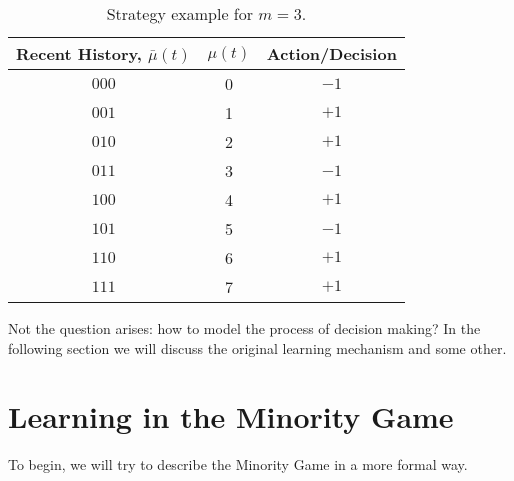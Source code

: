 \documentclass[11pt,american,czech]{article}
\begin{document}
\begin{table}
	\centering
	\begin{tabular}{|c|c||c|}
		\hline
		Recent History, $\bar{\mu}(t)$ & $\mu(t)$ & Action/Decision \\
		\hline
		\hline 
		$0 0 0$ & 0 & $-1$ \\ 
		$0 0 1$ & 1 & $+1$ \\ 
		$0 1 0$ & 2 & $+1$ \\ 
		$0 1 1$ & 3 & $-1$ \\ 
		$1 0 0$ & 4 & $+1$ \\ 
		$1 0 1$ & 5 & $-1$ \\ 
		$1 1 0$ & 6 & $+1$ \\ 
		$1 1 1$ & 7 & $+1$ \\
		\hline
	\end{tabular} 
	\caption{Strategy example for $m=3$.} 
	\label{tab:strategy_table_example}
\end{table}

Not the question arises: how to model the process of decision making? In the following section we will discuss the original learning mechanism and some other.

\section{Learning in the Minority Game}

To begin, we will try to describe the Minority Game in a more formal way. 

\newpage{}



%

\end{document}
